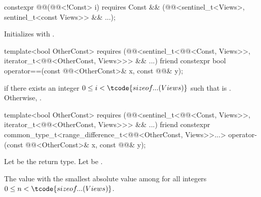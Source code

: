 %
\begin{itemdecl}
constexpr @@(@@<!Const> i)
  requires Const && (@@<sentinel_t<Views>, sentinel_t<const Views>> && ...);
\end{itemdecl}

\begin{itemdescr}
\pnum
\effects
Initializes  with .
\end{itemdescr}

%
\begin{itemdecl}
template<bool OtherConst>
  requires (@@<sentinel_t<@@<Const, Views>>,
                         iterator_t<@@<OtherConst, Views>>> && ...)
friend constexpr bool operator==(const @@<OtherConst>& x, const @@& y);
\end{itemdecl}

\begin{itemdescr}
\pnum
\returns
{} if there exists an integer $0 \leq i < \tcode{sizeof...(Views)}$
such that  is .
Otherwise, .
\end{itemdescr}

%
\begin{itemdecl}
template<bool OtherConst>
  requires (@@<sentinel_t<@@<Const, Views>>,
                               iterator_t<@@<OtherConst, Views>>> && ...)
friend constexpr common_type_t<range_difference_t<@@<OtherConst, Views>>...>
  operator-(const @@<OtherConst>& x, const @@& y);
\end{itemdecl}

\begin{itemdescr}
\pnum
Let  be the return type.
Let  be
.

\pnum
\returns
The value with the smallest absolute value among 
for all integers $0 \leq n < \tcode{sizeof...(Views)}$.
\end{itemdescr}

